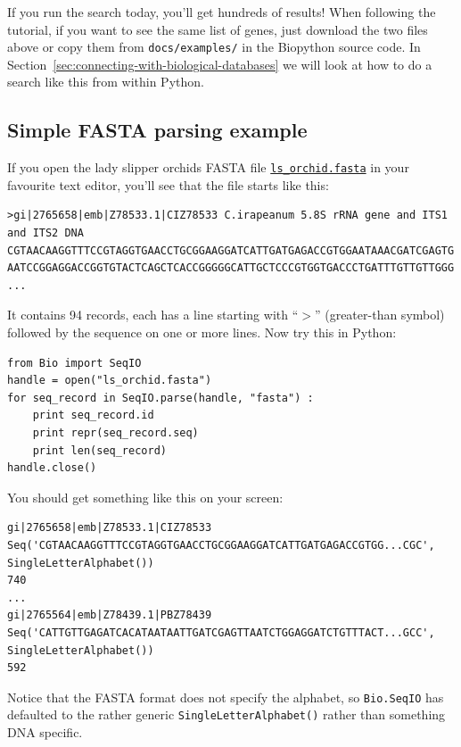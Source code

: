 \documentclass{report}
\begin{document}
If you run the search today, you'll get hundreds of results!  When following the tutorial, if you want to see the same list of genes, just download the two files above or copy them from \verb|docs/examples/| in the Biopython source code.  In Section~\ref{sec:connecting-with-biological-databases} we will look at how to do a search like this from within Python.

\subsection{Simple FASTA parsing example}
\label{sec:fasta-parsing}

If you open the lady slipper orchids FASTA file \href{http://biopython.org/DIST/docs/tutorial/examples/ls_orchid.fasta}{\tt ls\_orchid.fasta} in your favourite text editor, you'll see that the file starts like this:

\begin{verbatim}
>gi|2765658|emb|Z78533.1|CIZ78533 C.irapeanum 5.8S rRNA gene and ITS1 and ITS2 DNA
CGTAACAAGGTTTCCGTAGGTGAACCTGCGGAAGGATCATTGATGAGACCGTGGAATAAACGATCGAGTG
AATCCGGAGGACCGGTGTACTCAGCTCACCGGGGGCATTGCTCCCGTGGTGACCCTGATTTGTTGTTGGG
...
\end{verbatim}

It contains 94 records, each has a line starting with ``$>$'' (greater-than symbol) followed by the sequence on one or more lines.  Now try this in Python:

\begin{verbatim}
from Bio import SeqIO
handle = open("ls_orchid.fasta")
for seq_record in SeqIO.parse(handle, "fasta") :
    print seq_record.id
    print repr(seq_record.seq)
    print len(seq_record)
handle.close()
\end{verbatim}

\noindent You should get something like this on your screen:

\begin{verbatim}
gi|2765658|emb|Z78533.1|CIZ78533
Seq('CGTAACAAGGTTTCCGTAGGTGAACCTGCGGAAGGATCATTGATGAGACCGTGG...CGC', SingleLetterAlphabet())
740
...
gi|2765564|emb|Z78439.1|PBZ78439
Seq('CATTGTTGAGATCACATAATAATTGATCGAGTTAATCTGGAGGATCTGTTTACT...GCC', SingleLetterAlphabet())
592
\end{verbatim}

Notice that the FASTA format does not specify the alphabet, so \verb|Bio.SeqIO| has defaulted to the rather generic \verb|SingleLetterAlphabet()| rather than something DNA specific.
\end{document}
